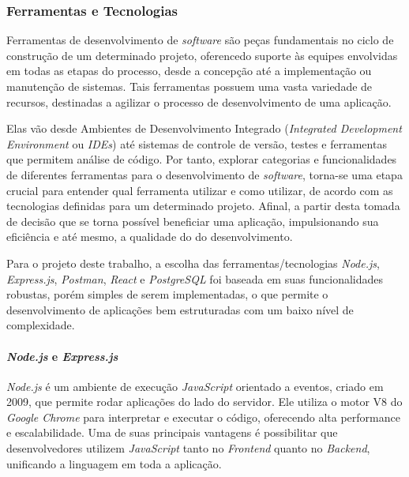 \documentclass[english,brazilian]{UNISINOSartigo} %
\begin{document}
\subsubsection{Ferramentas e Tecnologias}

Ferramentas de desenvolvimento de \textit{software} são peças fundamentais no ciclo de construção de um determinado projeto, oferencedo suporte às equipes envolvidas em todas as etapas do processo, desde a concepção até a implementação ou manutenção de sistemas. Tais ferramentas possuem uma vasta variedade de recursos, destinadas a agilizar o processo de desenvolvimento de uma aplicação.

Elas vão desde Ambientes de Desenvolvimento Integrado (\textit{Integrated Development Environment} ou \textit{IDEs}) até sistemas de controle de versão, testes e ferramentas que permitem análise de código. Por tanto, explorar categorias e funcionalidades de diferentes ferramentas para o desenvolvimento de \textit{software}, torna-se uma etapa crucial para entender qual ferramenta utilizar e como utilizar, de acordo com as tecnologias definidas para um determinado projeto. Afinal, a partir desta tomada de decisão que se torna possível beneficiar uma aplicação, impulsionando sua eficiência e até mesmo, a qualidade do do desenvolvimento.

Para o projeto deste trabalho, a escolha das ferramentas/tecnologias \textit{Node.js}, \textit{Express.js}, \textit{Postman}, \textit{React} e \textit{PostgreSQL} foi baseada em suas funcionalidades robustas, porém simples de serem implementadas, o que permite o desenvolvimento de aplicações bem estruturadas com um baixo nível de complexidade.


\paragraph{\textit{Node.js} e \textit{Express.js}}

\textit{Node.js} é um ambiente de execução \textit{JavaScript} orientado a eventos, criado em 2009, que permite rodar aplicações do lado do servidor. Ele utiliza o motor V8 do \textit{Google Chrome} para interpretar e executar o código, oferecendo alta performance e escalabilidade. Uma de suas principais vantagens é possibilitar que desenvolvedores utilizem \textit{JavaScript} tanto no \textit{Frontend} quanto no \textit{Backend}, unificando a linguagem em toda a aplicação.
\end{document}
